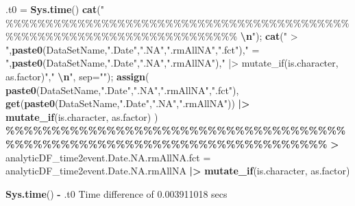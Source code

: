\documentclass[
]{article}
\newenvironment{Shaded}{\begin{snugshade}}{\end{snugshade}}
\newcommand{\AttributeTok}[1]{\textcolor[rgb]{0.13,0.29,0.53}{#1}}
\newcommand{\ErrorTok}[1]{\textcolor[rgb]{0.64,0.00,0.00}{\textbf{#1}}}
\newcommand{\FloatTok}[1]{\textcolor[rgb]{0.00,0.00,0.81}{#1}}
\newcommand{\FunctionTok}[1]{\textcolor[rgb]{0.13,0.29,0.53}{\textbf{#1}}}
\newcommand{\NormalTok}[1]{#1}
\newcommand{\OtherTok}[1]{\textcolor[rgb]{0.56,0.35,0.01}{#1}}
\newcommand{\SpecialCharTok}[1]{\textcolor[rgb]{0.81,0.36,0.00}{\textbf{#1}}}
\newcommand{\StringTok}[1]{\textcolor[rgb]{0.31,0.60,0.02}{#1}}
\begin{document}
\begin{Shaded}
\begin{Highlighting}[]
  
\NormalTok{.t0 }\OtherTok{=} \FunctionTok{Sys.time}\NormalTok{()}
\FunctionTok{cat}\NormalTok{(}\StringTok{"    \%\%\%\%\%\%\%\%\%\%\%\%\%\%\%\%\%\%\%\%\%\%\%\%\%\%\%\%\%\%\%\%\%\%\%\%\%\%\%\%\%\%\%\%\%\%\%\%\%\%\%\%\%\%\%\%\%\%\%\%\%\%\%\%\%\%\%\%\%\%\%\%    }\SpecialCharTok{\textbackslash{}n}\StringTok{"}\NormalTok{); }\FunctionTok{cat}\NormalTok{(}\StringTok{" \textgreater{} "}\NormalTok{,}\FunctionTok{paste0}\NormalTok{(DataSetName,}\StringTok{".Date"}\NormalTok{,}\StringTok{".NA"}\NormalTok{,}\StringTok{".rmAllNA"}\NormalTok{,}\StringTok{".fct"}\NormalTok{),}\StringTok{" = "}\NormalTok{,}\FunctionTok{paste0}\NormalTok{(DataSetName,}\StringTok{".Date"}\NormalTok{,}\StringTok{".NA"}\NormalTok{,}\StringTok{".rmAllNA"}\NormalTok{),}\StringTok{" |\textgreater{} mutate\_if(is.character, as.factor)"}\NormalTok{,}\StringTok{"  }\SpecialCharTok{\textbackslash{}n}\StringTok{"}\NormalTok{, }\AttributeTok{sep=}\StringTok{""}\NormalTok{); }\FunctionTok{assign}\NormalTok{( }\FunctionTok{paste0}\NormalTok{(DataSetName,}\StringTok{".Date"}\NormalTok{,}\StringTok{".NA"}\NormalTok{,}\StringTok{".rmAllNA"}\NormalTok{,}\StringTok{".fct"}\NormalTok{), }\FunctionTok{get}\NormalTok{(}\FunctionTok{paste0}\NormalTok{(DataSetName,}\StringTok{".Date"}\NormalTok{,}\StringTok{".NA"}\NormalTok{,}\StringTok{".rmAllNA"}\NormalTok{)) }\SpecialCharTok{|\textgreater{}} \FunctionTok{mutate\_if}\NormalTok{(is.character, as.factor) )}
    \SpecialCharTok{\%\%\%\%\%\%\%\%\%\%\%\%\%\%\%\%\%\%\%\%\%\%\%\%\%\%\%\%\%\%\%\%\%\%\%\%\%\%\%\%\%\%\%\%\%\%\%\%\%\%\%\%\%\%\%\%\%\%\%\%\%\%\%\%\%\%\%\%\%\%\%\%}    
 \ErrorTok{\textgreater{}}\NormalTok{ analyticDF\_time2event.Date.NA.rmAllNA.fct }\OtherTok{=}\NormalTok{ analyticDF\_time2event.Date.NA.rmAllNA }\SpecialCharTok{|\textgreater{}} \FunctionTok{mutate\_if}\NormalTok{(is.character, as.factor)  }
\end{Highlighting}
\end{Shaded}

\begin{Shaded}
\begin{Highlighting}[]
\FunctionTok{Sys.time}\NormalTok{() }\SpecialCharTok{{-}}\NormalTok{ .t0}
\NormalTok{Time difference of }\FloatTok{0.003911018}\NormalTok{ secs}
\end{Highlighting}
\end{Shaded}
\end{document}
